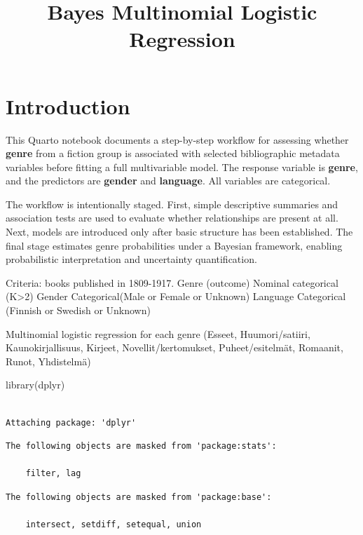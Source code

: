 \documentclass[
  letterpaper,
  DIV=11,
  numbers=noendperiod]{scrartcl}
\title{Bayes Multinomial Logistic Regression}
\author{}
\date{}
\newenvironment{Shaded}{\begin{snugshade}}{\end{snugshade}}
\newcommand{\FunctionTok}[1]{\textcolor[rgb]{0.28,0.35,0.67}{#1}}
\newcommand{\NormalTok}[1]{\textcolor[rgb]{0.00,0.23,0.31}{#1}}
\begin{document}
\maketitle


\section{Introduction}\label{introduction}

This Quarto notebook documents a step-by-step workflow for assessing
whether \textbf{genre} from a fiction group is associated with selected
bibliographic metadata variables before fitting a full multivariable
model. The response variable is \textbf{genre}, and the predictors are
\textbf{gender} and \textbf{language}. All variables are categorical.

The workflow is intentionally staged. First, simple descriptive
summaries and association tests are used to evaluate whether
relationships are present at all. Next, models are introduced only after
basic structure has been established. The final stage estimates genre
probabilities under a Bayesian framework, enabling probabilistic
interpretation and uncertainty quantification.

Criteria: books published in 1809-1917. Genre (outcome) Nominal
categorical (K\textgreater2) Gender Categorical(Male or Female or
Unknown) Language Categorical (Finnish or Swedish or Unknown)

Multinomial logistic regression for each genre (Esseet, Huumori/satiiri,
Kaunokirjallisuus, Kirjeet, Novellit/kertomukset, Puheet/esitelmät,
Romaanit, Runot, Yhdistelmä)

\begin{Shaded}
\begin{Highlighting}[]
\FunctionTok{library}\NormalTok{(dplyr)}
\end{Highlighting}
\end{Shaded}

\begin{verbatim}

Attaching package: 'dplyr'
\end{verbatim}

\begin{verbatim}
The following objects are masked from 'package:stats':

    filter, lag
\end{verbatim}

\begin{verbatim}
The following objects are masked from 'package:base':

    intersect, setdiff, setequal, union
\end{verbatim}
\end{document}
